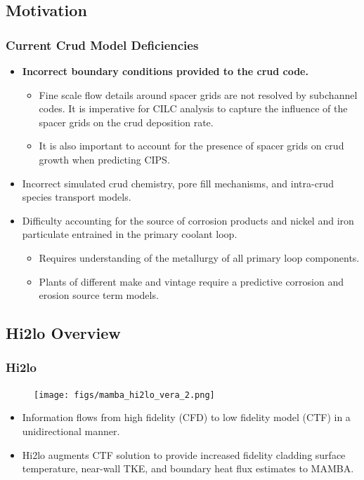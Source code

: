 \documentclass[t, pdftex]{beamer}
\begin{document}
\subsection*{Motivation}
\begin{frame}
\frametitle{Current Crud Model Deficiencies}
\begin{itemize}
    \item \textbf{Incorrect boundary conditions provided to the crud code.}
    \begin{itemize}
        \item Fine scale flow details around spacer grids are not resolved by subchannel codes.  It is imperative for CILC analysis to capture the influence of the spacer grids on the crud deposition rate.  
        \item It is also important to account for the presence of spacer grids on crud growth when predicting CIPS.
    \end{itemize}
    \item Incorrect simulated crud chemistry, pore fill mechanisms, and intra-crud species transport models.
    \item Difficulty accounting for the source of corrosion products and nickel and iron particulate entrained in the primary coolant loop.
    \begin{itemize}
        \item Requires understanding of the metallurgy of all primary loop components. 
        \item Plants of different make and vintage require a predictive corrosion and erosion source term models.
    \end{itemize}
\end{itemize}
\end{frame}


\subsection*{Hi2lo Overview}
\begin{frame}
\frametitle{Hi2lo}
\begin{figure}[]
    \vspace{-16.5pt}
    \centering
    \texttt{[image: figs/mamba\_hi2lo\_vera\_2.png]}
    \label{hi2lo_overview}
\end{figure}
\vspace{-16.5pt}
\begin{itemize}
    \item Information flows from high fidelity (CFD) to low fidelity model (CTF) in a unidirectional manner.
    \item Hi2lo augments CTF solution to provide increased fidelity cladding surface temperature, near-wall TKE, and boundary heat flux estimates to MAMBA.
\end{itemize}
\end{frame}
\end{document}
